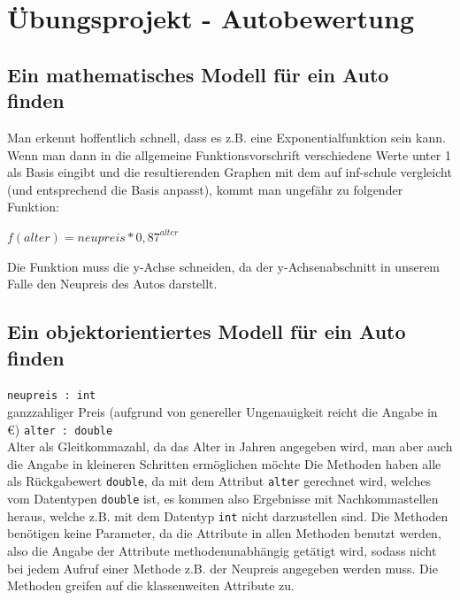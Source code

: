 \documentclass{scrartcl}   %
\begin{document}
\newpage

\section{Übungsprojekt - Autobewertung}

\subsection{Ein mathematisches Modell für ein Auto finden}

Man erkennt hoffentlich schnell, dass es z.B. eine Exponentialfunktion sein kann.\\
Wenn man dann in die allgemeine Funktionsvorschrift verschiedene Werte unter 1 als Basis eingibt und die resultierenden Graphen mit dem auf inf-schule vergleicht (und entsprechend die Basis anpasst), kommt man ungefähr zu folgender Funktion:

\begin{center}
    \texttt{$f(alter) = neupreis * 0,87^{ alter}$}
\end{center}

Die Funktion muss die y-Achse schneiden, da der y-Achsenabschnitt in unserem Falle den Neupreis des Autos darstellt.

\subsection{Ein objektorientiertes Modell für ein Auto finden}

\begin{itemize}
    \barrow \texttt{neupreis : int}\\
    ganzzahliger Preis (aufgrund von genereller Ungenauigkeit reicht die Angabe in \euro)
    \barrow \texttt{alter : double}\\
    Alter als Gleitkommazahl, da das Alter in Jahren angegeben wird, man aber auch die Angabe in kleineren Schritten ermöglichen möchte
    \barrow Die Methoden haben alle als Rückgabewert \texttt{double}, da mit dem Attribut \texttt{alter} gerechnet wird, welches vom Datentypen \texttt{double} ist, es kommen also Ergebnisse mit Nachkommastellen heraus, welche z.B. mit dem Datentyp \texttt{int} nicht darzustellen sind.
    \barrow Die Methoden benötigen keine Parameter, da die Attribute in allen Methoden benutzt werden, also die Angabe der Attribute methodenunabhängig getätigt wird, sodass nicht bei jedem Aufruf einer Methode z.B. der Neupreis angegeben werden muss. Die Methoden greifen auf die klassenweiten Attribute zu.
\end{itemize}
\end{document}
